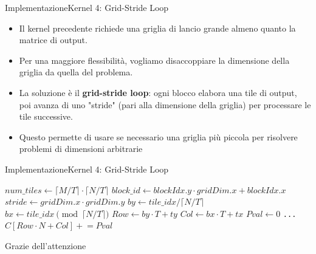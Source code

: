 \documentclass{beamer}
\begin{document}
\begin{frame}{Implementazione}{Kernel 4: Grid-Stride Loop}
    \begin{itemize}
        \item Il kernel precedente richiede una griglia di lancio grande almeno quanto la matrice di output.
        \item Per una maggiore flessibilità, vogliamo disaccoppiare la dimensione della griglia da quella del problema.
        \item La soluzione è il \textbf{grid-stride loop}: ogni blocco elabora una tile di output, poi avanza di uno "stride" (pari alla dimensione della griglia) per processare le tile successive.
        \item Questo permette di usare se necessario una griglia più piccola  per risolvere problemi di dimensioni arbitrarie
    \end{itemize}
\end{frame}

\begin{frame}{Implementazione}{Kernel 4: Grid-Stride Loop}
    \begin{algorithm}[H]
        \scriptsize
        \caption{Kernel finale con Grid-Stride Loop}
        \begin{algorithmic}[1]
            \State $num\_tiles \gets \lceil M/T \rceil \cdot \lceil N/T \rceil$
            \State $block\_id \gets blockIdx.y \cdot gridDim.x + blockIdx.x$
            \State $stride \gets gridDim.x \cdot gridDim.y$
            \Statex
            \State {}
            \State $by \gets tile\_idx / \lceil N/T \rceil$ 
            \State $bx \gets tile\_idx \pmod{\lceil N/T \rceil}$ 
            \Statex
            \State $Row \gets by \cdot T + ty$
            \State $Col \gets bx \cdot T + tx$
            \State $Pval \gets 0$
            \State {}
            \State {}
            \State \texttt{...}
            \State $C[Row\cdot N + Col] \mathrel{+}= Pval$
            \EndIf
            \State \EndFor
        \end{algorithmic}
    \end{algorithm}
\end{frame}





\begin{frame}
    \centering \Huge
    Grazie dell'attenzione
\end{frame}
\end{document}
